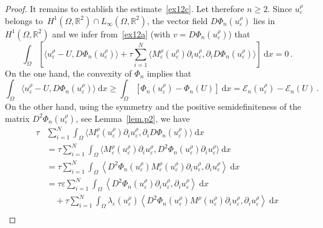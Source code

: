 \documentclass[AHL,Unicode,longabstracts,published]{cedram}
\newcommand{\bbR}{\mathbb{R}}
\newcommand{\clE}{\mathcal{E}}
\newcommand{\rmd}{\mathrm{d}}
\newcommand{\clE}{\mathcal{E}}
\begin{document}
\begin{proof}
It remains to establish the estimate~\eqref{ex12c}. Let therefore $n\ge 2$. Since $u_{\varepsilon}^\rho$ belongs to~$H^1(\Omega,\bbR^2)\cap L_\infty(\Omega,\bbR^2)$, the vector field $D\Phi_n(u_\varepsilon^\rho)$ lies in $H^1(\Omega,\bbR^2)$ and we infer from~\eqref{ex12a} (with $v=D\Phi_n(u_\varepsilon^\rho)$) that
\begin{equation}\label{pro1}
\int_\Omega \left[\big\langle u_{\varepsilon}^\rho -U, D\Phi_n(u_\varepsilon^\rho) \big\rangle + \tau \sum_{i=1}^N\big\langle M_{\varepsilon }^\rho(u_{\varepsilon}^\rho) \partial_i u_{\varepsilon}^\rho, \partial_i D\Phi_n(u_\varepsilon^\rho)\big\rangle \right]\ \rmd x = 0\,.
\end{equation}
On the one hand, the convexity of $\Phi_n$ implies that
\begin{equation}\label{pro2}
\int_\Omega \big\langle u_{\varepsilon}^\rho -U, D\Phi_n(u_\varepsilon^\rho) \big\rangle\ \rmd x \ge \int_\Omega \left[\Phi_n(u_{\varepsilon}^\rho) - \Phi_n(U)\right]\ \rmd x =\clE_n(u_\varepsilon^\rho) - \clE_n(U)\,.
\end{equation}
On the other hand, using the symmetry and the positive semidefiniteness of the matrix $ D^2\Phi_n(u_\varepsilon^\rho)$, see Lemma~\ref{lem.p2}, we have
\begingroup
\allowdisplaybreaks
\begin{equation}\label{pro3}
\begin{split}
\tau &\sum_{i=1}^N\int_\Omega \big\langle M_{\varepsilon}^\rho(u_{\varepsilon}^\rho) \partial_i u_{\varepsilon}^\rho, \partial_i D\Phi_n(u_\varepsilon^\rho)\big\rangle\ \rmd x \\[1ex]
&=\tau \sum_{i=1}^N\int_\Omega \big\langle M_{\varepsilon }^\rho(u_{\varepsilon}^\rho) \partial_i u_{\varepsilon}^\rho, D^2\Phi_n(u_\varepsilon^\rho)\partial _i u_\varepsilon^\rho\big\rangle\ \rmd x \\[1ex]
&=\tau \sum_{i=1}^N\int_\Omega \left\langle D^2\Phi_n(u_\varepsilon^\rho) M_{\varepsilon }^\rho(u_{\varepsilon}^\rho) \partial_i u_{\varepsilon}^\rho, \partial _i u_\varepsilon^\rho\right\rangle\ \rmd x
\\
&=\tau\varepsilon \sum_{i=1}^N\int_\Omega \left\langle D^2\Phi_n(u_\varepsilon^\rho) \partial_i u_{\varepsilon}^\rho, \partial _i u_\varepsilon^\rho\right\rangle\ \rmd x\\[1ex]
&\quad + \tau \sum_{i=1}^N\int_\Omega \lambda_\varepsilon(u_\varepsilon^\rho) \left\langle D^2\Phi_n(u_\varepsilon^\rho) M^\rho(u_\varepsilon^\rho) \partial_i u_{\varepsilon}^\rho, \partial _i u_\varepsilon^\rho\right\rangle\ \rmd x\\[1ex]

\end{split}
\end{equation}
\end{proof}
\end{document}
